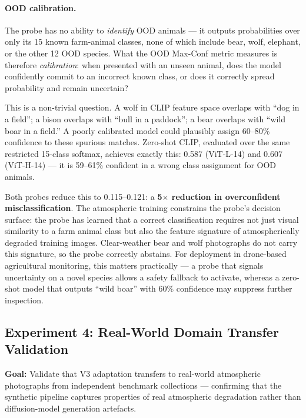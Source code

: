 \paragraph{OOD calibration.}
The probe has no ability to \emph{identify} OOD animals — it outputs probabilities over only its 15 known farm-animal classes, none of which include bear, wolf, elephant, or the other 12 OOD species. What the OOD Max-Conf metric measures is therefore \emph{calibration}: when presented with an unseen animal, does the model confidently commit to an incorrect known class, or does it correctly spread probability and remain uncertain?

\noindent This is a non-trivial question. A wolf in CLIP feature space overlaps with ``dog in a field''; a bison overlaps with ``bull in a paddock''; a bear overlaps with ``wild boar in a field.'' A poorly calibrated model could plausibly assign 60--80\% confidence to these spurious matches. Zero-shot CLIP, evaluated over the same restricted 15-class softmax, achieves exactly this: 0.587 (ViT-L-14) and 0.607 (ViT-H-14) — it is 59--61\% confident in a wrong class assignment for OOD animals.

\noindent Both probes reduce this to 0.115--0.121: a \textbf{5$\times$ reduction in overconfident misclassification}. The atmospheric training constrains the probe's decision surface: the probe has learned that a correct classification requires not just visual similarity to a farm animal class but also the feature signature of atmospherically degraded training images. Clear-weather bear and wolf photographs do not carry this signature, so the probe correctly abstains. For deployment in drone-based agricultural monitoring, this matters practically — a probe that signals uncertainty on a novel species allows a safety fallback to activate, whereas a zero-shot model that outputs ``wild boar'' with 60\% confidence may suppress further inspection.

\FloatBarrier
\subsection{Experiment 4: Real-World Domain Transfer Validation}
\label{sec:exp4}

\noindent \textbf{Goal:} Validate that V3 adaptation transfers to real-world atmospheric photographs from independent benchmark collections — confirming that the synthetic pipeline captures properties of real atmospheric degradation rather than diffusion-model generation artefacts.

